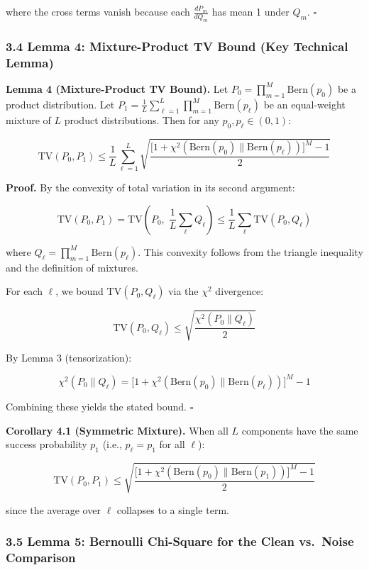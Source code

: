 \documentclass[
  12pt,
]{ctexart}
\begin{document}
where the cross terms vanish because each \(\frac{dP_m}{dQ_m}\) has mean
1 under \(Q_m\). \(\square\)

\subsubsection{3.4 Lemma 4: Mixture-Product TV Bound (Key Technical
Lemma)}\label{lemma-4-mixture-product-tv-bound-key-technical-lemma}

\textbf{Lemma 4 (Mixture-Product TV Bound).} Let
\(P_0 = \prod_{m=1}^M \text{Bern}(p_0)\) be a product distribution. Let
\(P_1 = \frac{1}{L} \sum_{\ell=1}^L \prod_{m=1}^M \text{Bern}(p_\ell)\)
be an equal-weight mixture of \(L\) product distributions. Then for any
\(p_0, p_\ell \in (0,1)\):

\[\text{TV}(P_0, P_1) \leq \frac{1}{L} \sum_{\ell=1}^L \sqrt{ \frac{ \bigl[1 + \chi^2(\text{Bern}(p_0) \parallel \text{Bern}(p_\ell))\bigr]^M - 1 }{2} }\]

\textbf{Proof.} By the convexity of total variation in its second
argument:

\[\text{TV}(P_0, P_1) = \text{TV}\!\left(P_0,\; \frac{1}{L}\sum_{\ell} Q_\ell\right) \leq \frac{1}{L}\sum_{\ell} \text{TV}(P_0, Q_\ell)\]

where \(Q_\ell = \prod_{m=1}^M \text{Bern}(p_\ell)\). This convexity
follows from the triangle inequality and the definition of mixtures.

For each \(\ell\), we bound \(\text{TV}(P_0, Q_\ell)\) via the
\(\chi^2\) divergence:

\[\text{TV}(P_0, Q_\ell) \leq \sqrt{\frac{\chi^2(P_0 \parallel Q_\ell)}{2}}\]

By Lemma 3 (tensorization):

\[\chi^2(P_0 \parallel Q_\ell) = \bigl[1 + \chi^2(\text{Bern}(p_0) \parallel \text{Bern}(p_\ell))\bigr]^M - 1\]

Combining these yields the stated bound. \(\square\)

\textbf{Corollary 4.1 (Symmetric Mixture).} When all \(L\) components
have the same success probability \(p_1\) (i.e., \(p_\ell = p_1\) for
all \(\ell\)):

\[\text{TV}(P_0, P_1) \leq \sqrt{ \frac{ \bigl[1 + \chi^2(\text{Bern}(p_0) \parallel \text{Bern}(p_1))\bigr]^M - 1 }{2} }\]

since the average over \(\ell\) collapses to a single term.

\subsubsection{3.5 Lemma 5: Bernoulli Chi-Square for the Clean vs.~Noise
Comparison}\label{lemma-5-bernoulli-chi-square-for-the-clean-vs.-noise-comparison}
\end{document}
